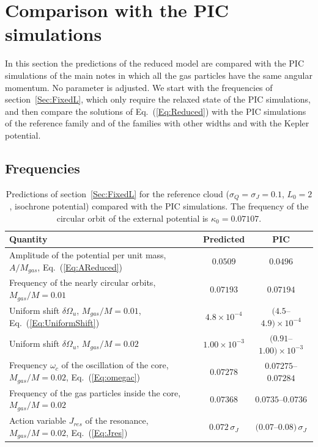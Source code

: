\documentclass[prd,aps,nofootinbib,superscriptaddress,amsmath,amssymb]{revtex4}
\begin{document}
\section{Comparison with the PIC simulations}
\label{Sec:Comparison}

In this section the predictions of the reduced model are compared with the PIC simulations of the main notes in which all the gas particles have the same angular momentum. No parameter is adjusted. We start with the frequencies of section~\ref{Sec:FixedL}, which only require the relaxed state of the PIC simulations, and then compare the solutions of Eq.~(\ref{Eq:Reduced}) with the PIC simulations of the reference family and of the families with other widths and with the Kepler potential.


\subsection{Frequencies}
\label{SubSec:CompFreq}

\begin{table}[htp]
\begin{tabular}{|l|c|c|}\hline
Quantity & Predicted & PIC \\\hline
Amplitude of the potential per unit mass, $A/M_{gas}$, Eq.~(\ref{Eq:AReduced}) & $0.0509$ & $0.0496$ \\
Frequency of the nearly circular orbits, $M_{gas}/M = 0.01$ & $0.07193$ & $0.07194$ \\
Uniform shift $\delta\Omega_u$, $M_{gas}/M = 0.01$, Eq.~(\ref{Eq:UniformShift}) & $4.8\times 10^{-4}$ & $(4.5$--$4.9)\times 10^{-4}$ \\
Uniform shift $\delta\Omega_u$, $M_{gas}/M = 0.02$ & $1.00\times 10^{-3}$ & $(0.91$--$1.00)\times 10^{-3}$ \\
Frequency $\omega_c$ of the oscillation of the core, $M_{gas}/M = 0.02$, Eq.~(\ref{Eq:omegac}) & $0.07278$ & $0.07275$--$0.07284$ \\
Frequency of the gas particles inside the core, $M_{gas}/M = 0.02$ & $0.07368$ & $0.0735$--$0.0736$ \\
Action variable $J_{res}$ of the resonance, $M_{gas}/M = 0.02$, Eq.~(\ref{Eq:Jres}) & $0.072\,\sigma_J$ & $(0.07$--$0.08)\,\sigma_J$ \\
\hline
\end{tabular}
\caption{Predictions of section~\ref{Sec:FixedL} for the reference cloud ($\sigma_Q = \sigma_J = 0.1$, $L_0 = 2$, isochrone potential) compared with the PIC simulations. The frequency of the circular orbit of the external potential is $\kappa_0 = 0.07107$.}
\label{Tab:Frequencies}
\end{table}
\end{document}
